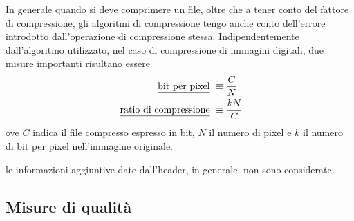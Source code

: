 \documentclass{subfiles}
\begin{document}
In generale quando si deve comprimere un file, oltre che a tener conto del fattore di compressione,
gli algoritmi di compressione tengo anche conto dell'errore introdotto dall'operazione di compressione stessa.
Indipendentemente dall'algoritmo utilizzato, nel caso di compressione di immagini digitali, due misure importanti risultano essere
\[\begin{aligned}
        \text{\underline{bit per pixel}}         & \equiv \frac{C}{N}  \\
        \text{\underline{ratio di compressione}} & \equiv \frac{kN}{C}
    \end{aligned}\]
ove \(C\) indica il file compresso espresso in bit, \(N\) il numero di pixel e \(k\) il numero di bit per pixel nell'immagine originale.

\begin{Note*}
    le informazioni aggiuntive date dall'header, in generale, non sono considerate.
\end{Note*}

\subsection{Misure di qualità}

\end{document}
